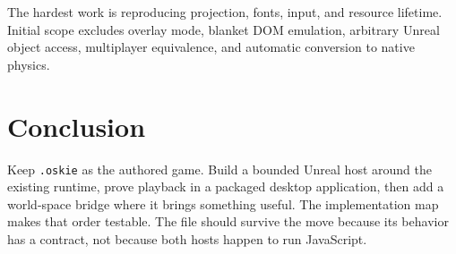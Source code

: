 \documentclass[10pt,letterpaper,twocolumn]{article}
\newcommand{\code}[1]{\texttt{\nolinkurl{#1}}}
\begin{document}
The hardest work is reproducing projection, fonts, input, and resource lifetime. Initial scope excludes overlay mode, blanket DOM emulation, arbitrary Unreal object access, multiplayer equivalence, and automatic conversion to native physics.

\section{Conclusion}\label{sec:conclusion}
Keep \code{.oskie} as the authored game. Build a bounded Unreal host around the existing runtime, prove playback in a packaged desktop application, then add a world-space bridge where it brings something useful. The implementation map makes that order testable. The file should survive the move because its behavior has a contract, not because both hosts happen to run JavaScript.

\balance


\end{document}
